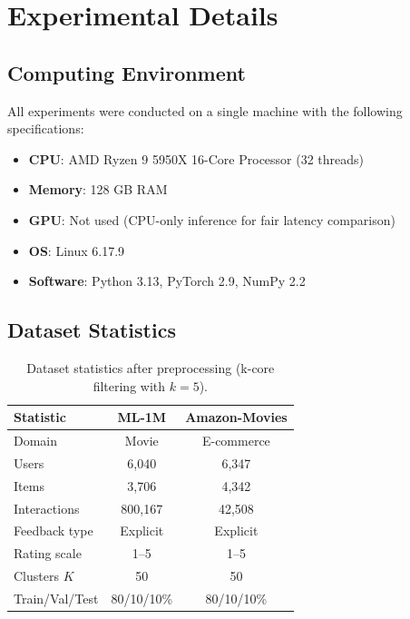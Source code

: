 \documentclass{article}
\begin{document}
\section{Experimental Details}
\label{app:experimental_details}

\subsection{Computing Environment}
All experiments were conducted on a single machine with the following specifications:
\begin{itemize}
    \item \textbf{CPU}: AMD Ryzen 9 5950X 16-Core Processor (32 threads)
    \item \textbf{Memory}: 128 GB RAM
    \item \textbf{GPU}: Not used (CPU-only inference for fair latency comparison)
    \item \textbf{OS}: Linux 6.17.9
    \item \textbf{Software}: Python 3.13, PyTorch 2.9, NumPy 2.2
\end{itemize}

\subsection{Dataset Statistics}
\label{app:datasets}

\begin{table}[h]
\centering
\caption{Dataset statistics after preprocessing (k-core filtering with $k=5$).}
\label{tab:dataset_stats}
\small
\begin{tabular}{lcc}
\toprule
\textbf{Statistic} & \textbf{ML-1M} & \textbf{Amazon-Movies} \\
\midrule
Domain & Movie & E-commerce \\
Users & 6,040 & 6,347 \\
Items & 3,706 & 4,342 \\
Interactions & 800,167 & 42,508 \\
Feedback type & Explicit & Explicit \\
Rating scale & 1--5 & 1--5 \\
Clusters $K$ & 50 & 50 \\
Train/Val/Test & 80/10/10\% & 80/10/10\% \\
\bottomrule
\end{tabular}
\end{table}
\end{document}
